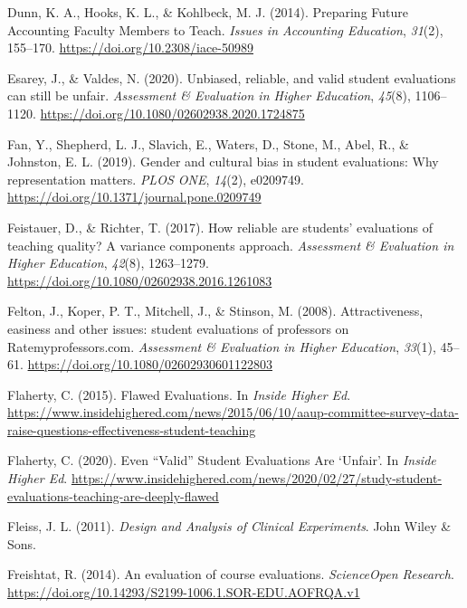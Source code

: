 \documentclass[
  man]{apa7}
\newlength{\cslhangindent}
\newenvironment{CSLReferences}[2] %
 {\begin{list}{}{%
  \setlength{\itemindent}{0pt}
  \setlength{\leftmargin}{0pt}
  \setlength{\parsep}{0pt}
  \ifodd #1
   \setlength{\leftmargin}{\cslhangindent}
   \setlength{\itemindent}{-1\cslhangindent}
  \fi
  \setlength{\itemsep}{#2\baselineskip}}}
 {\end{list}}
\begin{document}
\begin{CSLReferences}{1}{0}
Dunn, K. A., Hooks, K. L., \& Kohlbeck, M. J. (2014). Preparing Future Accounting Faculty Members to Teach. \emph{Issues in Accounting Education}, \emph{31}(2), 155--170. \url{https://doi.org/10.2308/iace-50989}

Esarey, J., \& Valdes, N. (2020). Unbiased, reliable, and valid student evaluations can still be unfair. \emph{Assessment \& Evaluation in Higher Education}, \emph{45}(8), 1106--1120. \url{https://doi.org/10.1080/02602938.2020.1724875}

Fan, Y., Shepherd, L. J., Slavich, E., Waters, D., Stone, M., Abel, R., \& Johnston, E. L. (2019). Gender and cultural bias in student evaluations: Why representation matters. \emph{PLOS ONE}, \emph{14}(2), e0209749. \url{https://doi.org/10.1371/journal.pone.0209749}

Feistauer, D., \& Richter, T. (2017). How reliable are students{'} evaluations of teaching quality? A variance components approach. \emph{Assessment \& Evaluation in Higher Education}, \emph{42}(8), 1263--1279. \url{https://doi.org/10.1080/02602938.2016.1261083}

Felton, J., Koper, P. T., Mitchell, J., \& Stinson, M. (2008). Attractiveness, easiness and other issues: student evaluations of professors on Ratemyprofessors.com. \emph{Assessment \& Evaluation in Higher Education}, \emph{33}(1), 45--61. \url{https://doi.org/10.1080/02602930601122803}

Flaherty, C. (2015). Flawed {Evaluations}. In \emph{Inside Higher Ed}. \url{https://www.insidehighered.com/news/2015/06/10/aaup-committee-survey-data-raise-questions-effectiveness-student-teaching}

Flaherty, C. (2020). Even {``{Valid}''} {Student} {Evaluations} {Are} `{Unfair}'. In \emph{Inside Higher Ed}. \url{https://www.insidehighered.com/news/2020/02/27/study-student-evaluations-teaching-are-deeply-flawed}

Fleiss, J. L. (2011). \emph{Design and Analysis of Clinical Experiments}. John Wiley \& Sons.

Freishtat, R. (2014). An evaluation of course evaluations. \emph{ScienceOpen Research}. \url{https://doi.org/10.14293/S2199-1006.1.SOR-EDU.AOFRQA.v1}


\end{CSLReferences}
\end{document}
